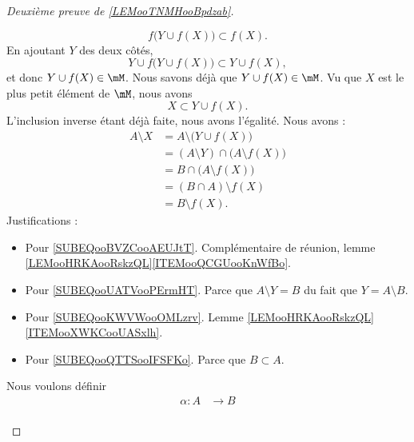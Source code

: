 \begin{proof}[Deuxième preuve de \ref{LEMooTNMHooBpdzab}\cite{BIBooZFPUooIiywbk}]
\begin{subproof}
		\begin{equation}
			f\big( Y\cup f(X) \big)\subset f(X).
		\end{equation}
		En ajoutant \( Y\) des deux côtés,
		\begin{equation}
			Y\cup f\big( Y\cup f(X) \big)\subset Y\cup f(X),
		\end{equation}
		et donc \( Y\cup f(X)\in \mM\).
		\spitem[\( Y\cup f(X)=X\)]
		Nous savons déjà que \( Y\cup f(X)\in \mM\). Vu que \( X\) est le plus petit élément de \( \mM\), nous avons
		\begin{equation}
			X\subset Y\cup f(X).
		\end{equation}
		L'inclusion inverse étant déjà faite, nous avons l'égalité.
		\spitem[\( B\setminus f(X)=A\setminus X\)]
		Nous avons :
		\begin{subequations}
			\begin{align}
				A\setminus X & =A\setminus\big( Y\cup f(X) \big)                                               \\
				             & =(A\setminus Y)\cap \big( A\setminus f(X) \big)     \label{SUBEQooBVZCooAEUJtT} \\
				             & =B\cap \big( A\setminus f(X) \big)         \label{SUBEQooUATVooPErmHT}          \\
				             & =(B\cap A)\setminus f(X)       \label{SUBEQooKWVWooOMLzrv}                      \\
				             & =B\setminus f(X).      \label{SUBEQooQTTSooIFSFKo}
			\end{align}
		\end{subequations}
		Justifications :
		\begin{itemize}
			\item Pour \eqref{SUBEQooBVZCooAEUJtT}. Complémentaire de réunion, lemme \ref{LEMooHRKAooRskzQL}\ref{ITEMooQCGUooKnWfBo}.
			\item Pour \eqref{SUBEQooUATVooPErmHT}. Parce que \( A\setminus Y=B\) du fait que \( Y=A\setminus B\).
			\item Pour \eqref{SUBEQooKWVWooOMLzrv}. Lemme \ref{LEMooHRKAooRskzQL}\ref{ITEMooXWKCooUASxlh}.
			\item Pour \eqref{SUBEQooQTTSooIFSFKo}. Parce que \( B\subset A\).
		\end{itemize}
		Nous voulons définir
		\begin{equation}
			\begin{aligned}
				\alpha\colon A & \to B                                        \\

\end{aligned}
\end{equation}
\end{subproof}
\end{proof}
